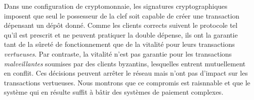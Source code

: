 \documentclass[a4,twocolumn,10pt]{article}
\theoremstyle{definition}
\begin{document}
Dans une configuration de cryptomonnaie, les signatures cryptographiques imposent que seul le possesseur de la clef soit capable de créer une transaction dépensant un dépôt donné. Comme les clients corrects suivent le protocole tel qu'il est prescrit et ne peuvent pratiquer la double dépense, ils ont la garantie tant de la sûreté de fonctionnement que de la vitalité pour leurs transactions \emph{vertueuses}. Par contraste, la vitalité n'est pas garantie pour les transactions \emph{malveillantes} soumises par des clients byzantins, lesquelles entrent mutuellement en conflit. Ces décisions peuvent arrêter le réseau mais n'ont pas d'impact sur les transactions vertueuses.
Nous montrons que ce compromis est raisnnable et que le système qui en résulte suffit à bâtir des systèmes de paiement complexes.



\end{document}
